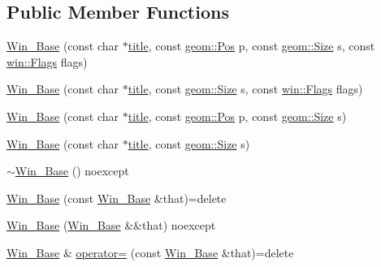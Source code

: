 \subsection*{Public Member Functions}
\begin{DoxyCompactItemize}
\item 
\mbox{\hyperlink{classrolmodl_1_1_win___base_a3ff14fcd3028c11faaaa4dc2b70de9ac}{Win\+\_\+\+Base}} (const char $\ast$\mbox{\hyperlink{classrolmodl_1_1_win___base_abc249a06cd285e302175c0371ed2564a}{title}}, const \mbox{\hyperlink{structrolmodl_1_1geom_1_1_pos}{geom\+::\+Pos}} p, const \mbox{\hyperlink{structrolmodl_1_1geom_1_1_size}{geom\+::\+Size}} s, const \mbox{\hyperlink{structrolmodl_1_1win_1_1_flags}{win\+::\+Flags}} flags)
\item 
\mbox{\hyperlink{classrolmodl_1_1_win___base_aaa9e04d7aa993555afbdf34ab3fd92f0}{Win\+\_\+\+Base}} (const char $\ast$\mbox{\hyperlink{classrolmodl_1_1_win___base_abc249a06cd285e302175c0371ed2564a}{title}}, const \mbox{\hyperlink{structrolmodl_1_1geom_1_1_size}{geom\+::\+Size}} s, const \mbox{\hyperlink{structrolmodl_1_1win_1_1_flags}{win\+::\+Flags}} flags)
\item 
\mbox{\hyperlink{classrolmodl_1_1_win___base_a520190cbd5064e620f0fca89eaae6f06}{Win\+\_\+\+Base}} (const char $\ast$\mbox{\hyperlink{classrolmodl_1_1_win___base_abc249a06cd285e302175c0371ed2564a}{title}}, const \mbox{\hyperlink{structrolmodl_1_1geom_1_1_pos}{geom\+::\+Pos}} p, const \mbox{\hyperlink{structrolmodl_1_1geom_1_1_size}{geom\+::\+Size}} s)
\item 
\mbox{\hyperlink{classrolmodl_1_1_win___base_afb98cea3cee1b466a4bb51d275123238}{Win\+\_\+\+Base}} (const char $\ast$\mbox{\hyperlink{classrolmodl_1_1_win___base_abc249a06cd285e302175c0371ed2564a}{title}}, const \mbox{\hyperlink{structrolmodl_1_1geom_1_1_size}{geom\+::\+Size}} s)
\item 
\mbox{\hyperlink{classrolmodl_1_1_win___base_a42f630fc07be4c39c9fb424bfbf5d398}{$\sim$\+Win\+\_\+\+Base}} () noexcept
\item 
\mbox{\hyperlink{classrolmodl_1_1_win___base_afa33e371e1333e1fee8c2aac7fadf3d7}{Win\+\_\+\+Base}} (const \mbox{\hyperlink{classrolmodl_1_1_win___base}{Win\+\_\+\+Base}} \&that)=delete
\item 
\mbox{\hyperlink{classrolmodl_1_1_win___base_a87cda590b1948eaf6d1638fe044cdd63}{Win\+\_\+\+Base}} (\mbox{\hyperlink{classrolmodl_1_1_win___base}{Win\+\_\+\+Base}} \&\&that) noexcept
\item 
\mbox{\hyperlink{classrolmodl_1_1_win___base}{Win\+\_\+\+Base}} \& \mbox{\hyperlink{classrolmodl_1_1_win___base_a0e6f5c3f13dd7f8a30c9e689a8dddb58}{operator=}} (const \mbox{\hyperlink{classrolmodl_1_1_win___base}{Win\+\_\+\+Base}} \&that)=delete

\end{DoxyCompactItemize}
